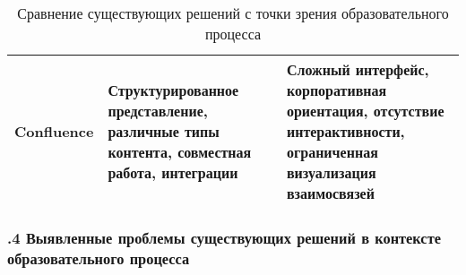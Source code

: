 {\begin{table}[h]
\begin{tabular}{|p{3cm}|p{6cm}|p{6cm}|}
      \hline
      Confluence & Структурированное представление, различные типы контента, совместная работа, интеграции & Сложный интерфейс, корпоративная ориентация, отсутствие интерактивности, ограниченная визуализация взаимосвязей \\
      \hline
    \end{tabular}
    \caption{Сравнение существующих решений с точки зрения образовательного процесса}
  \end{table}

  \par
}

\subtitlespace

\subsubsection*{ 
  \gostTitleFont
  .4 Выявленные проблемы существующих решений в контексте образовательного процесса
} 

\subtitlespace

